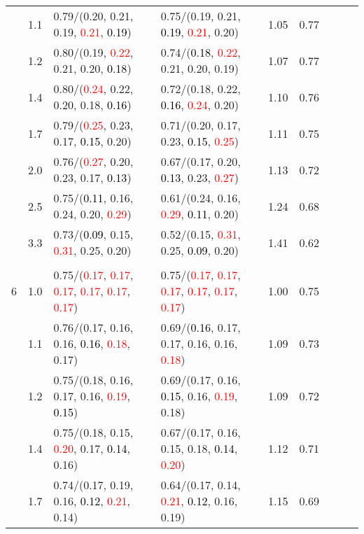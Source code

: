 \documentclass[10pt,a4paper]{report}
\begin{document}
\begin{table}[!htbp]
\begin{center}
{\begin{tabular}{ccllccccc}
			&1.1&0.79/(0.20, 0.21, 0.19, \textcolor{red}{0.21}, \textcolor{black}{0.19})&0.75/(0.19, 0.21, \textcolor{black}{0.19}, \textcolor{red}{0.21}, 0.20)&1.05&0.77\\
			&1.2&0.80/(0.19, \textcolor{red}{0.22}, 0.21, 0.20, \textcolor{black}{0.18})&0.74/(\textcolor{black}{0.18}, \textcolor{red}{0.22}, 0.21, 0.20, 0.19)&1.07&0.77\\
			&1.4&0.80/(\textcolor{red}{0.24}, 0.22, 0.20, 0.18, \textcolor{black}{0.16})&0.72/(0.18, 0.22, \textcolor{black}{0.16}, \textcolor{red}{0.24}, 0.20)&1.10&0.76\\
			&1.7&0.79/(\textcolor{red}{0.25}, 0.23, 0.17, \textcolor{black}{0.15}, 0.20)&0.71/(0.20, 0.17, 0.23, \textcolor{black}{0.15}, \textcolor{red}{0.25})&1.11&0.75\\
			&2.0&0.76/(\textcolor{red}{0.27}, 0.20, 0.23, 0.17, \textcolor{black}{0.13})&0.67/(0.17, 0.20, \textcolor{black}{0.13}, 0.23, \textcolor{red}{0.27})&1.13&0.72\\
			&2.5&0.75/(\textcolor{black}{0.11}, 0.16, 0.24, 0.20, \textcolor{red}{0.29})&0.61/(0.24, 0.16, \textcolor{red}{0.29}, \textcolor{black}{0.11}, 0.20)&1.24&0.68\\
			&3.3&0.73/(\textcolor{black}{0.09}, 0.15, \textcolor{red}{0.31}, 0.25, 0.20)&0.52/(0.15, \textcolor{red}{0.31}, 0.25, \textcolor{black}{0.09}, 0.20)&1.41&0.62\\
			&&&&\\
			6			&1.0&0.75/(\textcolor{red}{0.17}, \textcolor{red}{0.17}, \textcolor{red}{0.17}, \textcolor{red}{0.17}, \textcolor{red}{0.17}, \textcolor{red}{0.17})&0.75/(\textcolor{red}{0.17}, \textcolor{red}{0.17}, \textcolor{red}{0.17}, \textcolor{red}{0.17}, \textcolor{red}{0.17}, \textcolor{red}{0.17})&1.00&0.75\\
			&1.1&0.76/(0.17, 0.16, 0.16, \textcolor{black}{0.16}, \textcolor{red}{0.18}, 0.17)&0.69/(\textcolor{black}{0.16}, 0.17, 0.17, 0.16, 0.16, \textcolor{red}{0.18})&1.09&0.73\\
			&1.2&0.75/(0.18, 0.16, 0.17, 0.16, \textcolor{red}{0.19}, \textcolor{black}{0.15})&0.69/(0.17, 0.16, \textcolor{black}{0.15}, 0.16, \textcolor{red}{0.19}, 0.18)&1.09&0.72\\
			&1.4&0.75/(0.18, 0.15, \textcolor{red}{0.20}, 0.17, \textcolor{black}{0.14}, 0.16)&0.67/(0.17, 0.16, 0.15, 0.18, \textcolor{black}{0.14}, \textcolor{red}{0.20})&1.12&0.71\\
			&1.7&0.74/(0.17, 0.19, 0.16, \textcolor{black}{0.12}, \textcolor{red}{0.21}, 0.14)&0.64/(0.17, 0.14, \textcolor{red}{0.21}, \textcolor{black}{0.12}, 0.16, 0.19)&1.15&0.69\\

\end{tabular}}
\end{center}
\end{table}
\end{document}
